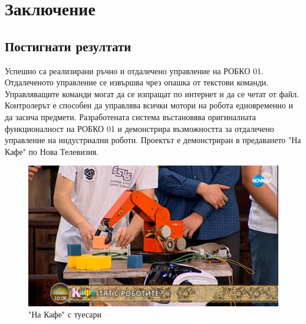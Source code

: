 \chapter{Заключение}
\section{Постигнати резултати}
Успешно са реализирани ръчно и отдалечено управление на РОБКО 01. Отдалеченото управление се извършва чрез опашка от текстови команди. Управляващите команди могат да се изпращат по интернет и да се четат от файл. Контролерът е способен да управлява всички мотори на робота едновременно и да засича предмети. Разработената система въстановява оригиналната функционалност на РОБКО 01 и демонстрира възможността за отдалечено управление на индустриални роботи. Проектът е демонстриран в предаването "На Кафе" по Нова Телевизия. \cite{na_kafe}
\begin{figure}[!htb]
    \centering
    \includegraphics[width=\linewidth]{pictures/na_kafe_s_robko.png}
    \caption{"На Кафе" с туесари}
    \label{fig:na_kafe}
\end{figure}
